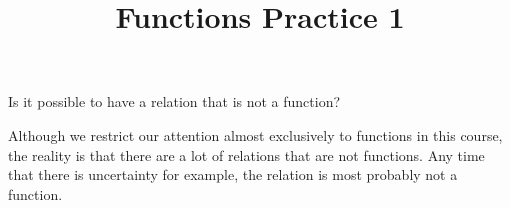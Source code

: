\documentclass{ximera}
\title{Functions Practice 1}
\begin{document}
%
%

\begin{problem}
    Is it possible to have a relation that is not a function?
    \begin{multipleChoice}
    \end{multipleChoice}
    \begin{feedback}
        Although we restrict our attention almost exclusively to functions in this course, the reality is that there are a lot of relations that are not functions. Any time that there is uncertainty for example, the relation is most probably not a function.
    \end{feedback}
\end{problem}
\end{document}
